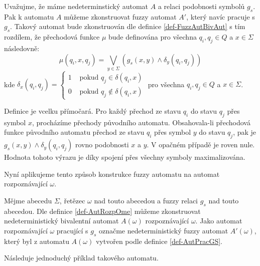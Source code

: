 \documentclass[a4paper,10pt]{article}
\begin{document}
\begin{definition} \label{def-AutPracGS}
Uvažujme, že máme nedeterminstický automat $A$ a relaci podobnosti symbolů $g_s$. Pak k automatu $A$ můžeme zkonstruovat fuzzy automat $A'$, který navíc pracuje s $g_s$. Takový automat bude zkonstruován dle definice \ref{def-FuzzAutBivAut} s tím rozdílem, že přechodová funkce $\mu$ bude definována pro všechna $q_i, q_j \in Q$ a $x \in \Sigma$ následovně:
$$
 \mu(q_i, x, q_j) = \bigvee_{y \in \Sigma} (g_s (x, y) \wedge \delta_y (q_i, q_j))
$$
 kde $\delta_x(q_i, q_j) = 
  \begin{cases}
   1 & \text{ pokud } q_j \in \delta(q_i, x)		\\
   0 & \text{ pokud } q_j \notin \delta(q_i, x)
  \end{cases}
 $ pro všechna $q_i, q_j \in Q$ a $x \in \Sigma$.
\end{definition}

Definice je vcelku přímočará. Pro každý přechod ze stavu $q_i$ do stavu $q_j$ přes symbol $x$, procházíme přechody původního automatu. Obsahovala-li přechodová funkce původního automatu přechod ze stavu $q_i$ přes symbol $y$ do stavu $q_j$, pak je $g_s (x, y) \wedge \delta_y (q_i, q_j)$ rovno podobnosti $x$ a $y$. V opačném případě je roven nule. Hodnota tohoto výrazu je díky spojení přes všechny symboly maximalizována.

Nyní aplikujeme tento způsob konstrukce fuzzy automatu na automat rozpoznávající $\omega$.

\begin{definition}
 Mějme abecedu $\Sigma$, řetězec $\omega$ nad touto abecedou a fuzzy relaci $g_s$ nad touto abecedou. Dle definice \ref{def-AutRozpOme} můžeme zkonstruovat nedeterministický bivalentní automat $A(\omega)$ rozpoznávající $\omega$. Jako automat rozpoznávající $\omega$ pracující s $g_s$ označme nedeterministický fuzzy automat $A'(\omega)$, který byl z automatu $A(\omega)$ vytvořen podle definice \ref{def-AutPracGS}.
\end{definition}


Následuje jednoduchý příklad takového automatu.
\end{document}
